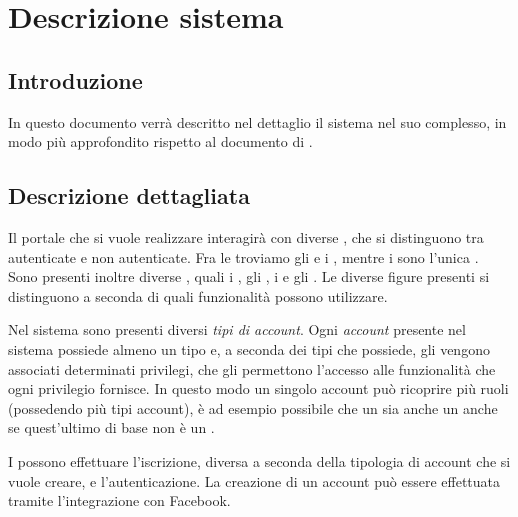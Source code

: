 \chapter{Descrizione sistema} 
\label{cha:specifica_sistema}

\section{Introduzione} 
In questo documento verrà descritto nel dettaglio il sistema nel suo complesso, in modo più approfondito rispetto al documento di .

\section{Descrizione dettagliata} 
\label{sec:descrizione_dettagliata}
Il portale che si vuole realizzare interagirà con diverse , che si distinguono tra autenticate e non autenticate. Fra le  troviamo gli  e i , mentre i  sono l'unica .
Sono presenti inoltre diverse , quali i , gli , i  e gli .
Le diverse figure presenti si distinguono a seconda di quali funzionalità possono utilizzare. 

\bigskip
\noindent
Nel sistema sono presenti diversi \emph{tipi di account}.
Ogni \emph{account} presente nel sistema possiede almeno un tipo e, a seconda dei tipi che possiede, gli vengono associati determinati privilegi, che gli permettono l'accesso alle funzionalità che ogni privilegio fornisce. In questo modo un singolo account può ricoprire più ruoli (possedendo più tipi account), è ad esempio possibile che un  sia anche un  anche se quest'ultimo di base non è un .

I  possono effettuare l'iscrizione, diversa a seconda della tipologia di account che si vuole creare, e l'autenticazione. La creazione di un account  può essere effettuata tramite l'integrazione con Facebook.

